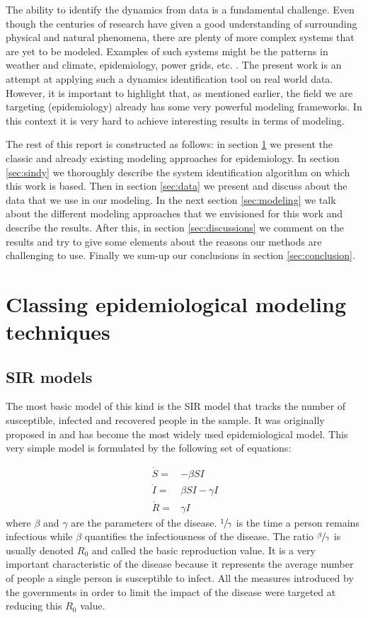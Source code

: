 \documentclass[12pt, letterpaper]{article}
\begin{document}
The ability to identify the dynamics from data is a fundamental challenge. 
Even though the centuries of research have given a good understanding of surrounding physical and natural phenomena, there are plenty of more complex systems that are yet to be modeled. 
Examples of such systems might be the patterns in weather and climate, epidemiology, power grids, etc. \cite{sindy}. 
The present work is an attempt at applying such a dynamics identification tool on real world data. 
However, it is important to highlight that, as mentioned earlier, the field we are targeting (epidemiology) already has some very powerful modeling frameworks. 
In this context it is very hard to achieve interesting results in terms of modeling.

The rest of this report is constructed as follows: in section \ref{sec:sir} we present the classic and already existing modeling approaches for epidemiology. In section \ref{sec:sindy} we thoroughly describe the system identification algorithm on which this work is based. Then in section \ref{sec:data} we present and discuss about the data that we use in our modeling. In the next section \ref{sec:modeling} we talk about the different modeling approaches that we envisioned for this work and describe the results. After this, in section \ref{sec:discussions} we comment on the results and try to give some elements about the reasons our methods are challenging to use. Finally we sum-up our conclusions in section \ref{sec:conclusion}.

\section{Classing epidemiological modeling techniques}\label{sec:sir}

\subsection{SIR models}

The most basic model of this kind is the SIR model that tracks the number of susceptible, infected and recovered people in the sample. 
It was originally proposed in \cite{sir} and has become the most widely used epidemiological model.
This very simple model is formulated by the following set of equations:

\begin{equation}\label{eq:sir}\
\begin{split}
\dot{S} = &- \beta SI \\
\dot{I} = &\beta SI - \gamma I \\
\dot{R} = & \gamma I
\end{split}
\end{equation}
where $\beta$ and $\gamma$ are the parameters of the disease. 
$\sfrac{1}{\gamma}$ is the time a person remains infectious while $\beta$ quantifies the infectiousness of the disease. 
The ratio $\sfrac{\beta}{\gamma}$ is usually denoted $R_0$ and called the basic reproduction value. 
It is a very important characteristic of the disease because it represents the average number of people a single person is susceptible to infect. 
All the measures introduced by the governments in order to limit the impact of the disease were targeted at reducing this $R_0$ value. 
\end{document}
